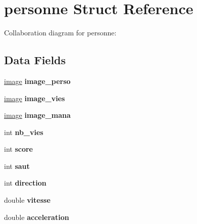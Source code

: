 \hypertarget{structpersonne}{}\section{personne Struct Reference}
\label{structpersonne}


Collaboration diagram for personne\+:
\subsection*{Data Fields}
\begin{DoxyCompactItemize}
\item 
\mbox{\label{structpersonne_a4a82edea685c7733a133694c3287de6f}} 
\hyperlink{structimage}{image} {\bfseries image\+\_\+perso}
\item 
\mbox{\label{structpersonne_a5318deff95078f1b7b93062e230d22eb}} 
\hyperlink{structimage}{image} {\bfseries image\+\_\+vies}
\item 
\mbox{\label{structpersonne_af030f5edd7c86f6ff89e58e13b4be85c}} 
\hyperlink{structimage}{image} {\bfseries image\+\_\+mana}
\item 
\mbox{\label{structpersonne_a9adbeb2b647de6296001c04af780586f}} 
int {\bfseries nb\+\_\+vies}
\item 
\mbox{\label{structpersonne_a35cd80afa8f0c480c622548519a0a769}} 
int {\bfseries score}
\item 
\mbox{\label{structpersonne_a587f7a46aabf6048cc8718c1437f53a8}} 
int {\bfseries saut}
\item 
\mbox{\label{structpersonne_ab0559963ac0a1ad115e05ee7a6813311}} 
int {\bfseries direction}
\item 
\mbox{\label{structpersonne_ad010fc1e2ba0b8102ddb52e3d98e9bed}} 
double {\bfseries vitesse}
\item 
\mbox{\label{structpersonne_a0f9cb853648584b58d59db5806dcb1e3}} 
double {\bfseries acceleration}
\item 
\mbox{\label{structpersonne_ada9af0d5ca6823b29cef4d933d53790d}} 

\end{DoxyCompactItemize}
